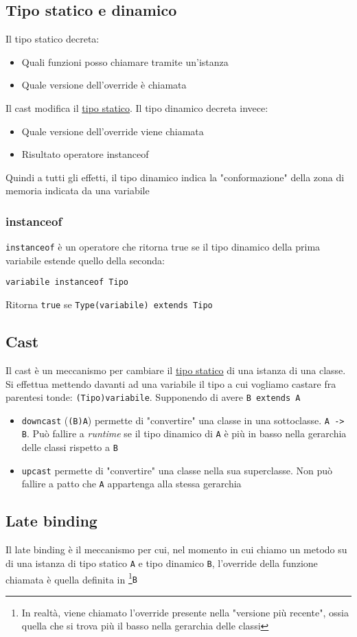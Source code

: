 \subsection{Tipo statico e dinamico}
Il tipo statico decreta:
\begin{itemize}
	\item Quali funzioni posso chiamare tramite un'istanza
	\item Quale versione dell'override è chiamata
\end{itemize}
Il cast modifica il \underline{tipo statico}. Il tipo dinamico decreta invece:
\begin{itemize}
	\item Quale versione dell'override viene chiamata
	\item Risultato operatore instanceof
\end{itemize}
Quindi a tutti gli effetti, il tipo dinamico indica la "conformazione" della zona di memoria indicata da una variabile
\subsubsection{instanceof}
\verb|instanceof| è un operatore che ritorna true se il tipo dinamico della prima variabile estende quello della seconda:
\begin{center}
	\verb|variabile instanceof Tipo|
\end{center}
Ritorna \verb|true| se \verb|Type(variabile) extends Tipo|

\subsection{Cast}
Il cast è un meccanismo per cambiare il \underline{tipo statico} di una istanza di una classe. Si effettua mettendo davanti ad una variabile il tipo a cui vogliamo castare fra parentesi tonde: \verb|(Tipo)variabile|. Supponendo di avere \verb|B extends A|
\begin{itemize}
	\item \verb|downcast| (\verb|(B)A|) permette di "convertire" una classe in una sottoclasse. \verb|A -> B|. Può fallire a \textit{runtime} se il tipo dinamico di \verb|A| è più in basso nella gerarchia delle classi rispetto a \verb|B|
	\item \verb|upcast| permette di "convertire" una classe nella sua superclasse. Non può fallire a patto che \verb|A| appartenga alla stessa gerarchia
\end{itemize}

\subsection{Late binding}
Il late binding è il meccanismo per cui, nel momento in cui chiamo un metodo su di una istanza di tipo statico \verb|A| e tipo dinamico \verb|B|, l'override della funzione chiamata è quella definita in \footnote{In realtà, viene chiamato l'override presente nella "versione più recente", ossia quella che si trova più il basso nella gerarchia delle classi}{\verb|B|}
\begin{tikzpicture}

\end{tikzpicture}

